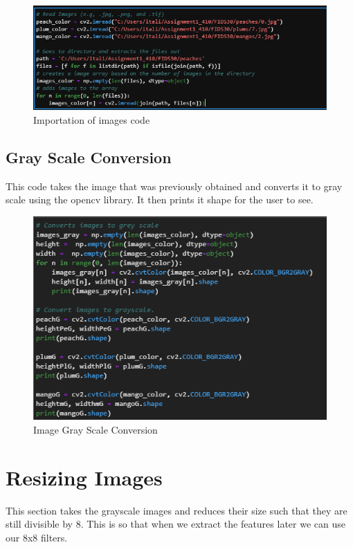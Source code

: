 \documentclass[conference]{IEEEtran}
\begin{document}
\begin{figure}[h]
  \centering
  \includegraphics[width=\linewidth]{part3_code.png}
  \caption{Importation of images code}
\end{figure}

\subsection{Gray Scale Conversion}
This code takes the image that was previously obtained and converts it to gray scale using the opencv library. It then prints it shape for the user to see.

\begin{figure}[h]
  \centering
  \includegraphics[width=\linewidth]{GrayScaleCode.png}
  \caption{Image Gray Scale Conversion}
\end{figure}

\section{Resizing Images}
This section takes the grayscale images and reduces their size such that they are still divisible by 8. This is so that when we extract the features later we can use our 8x8 filters.
\end{document}
